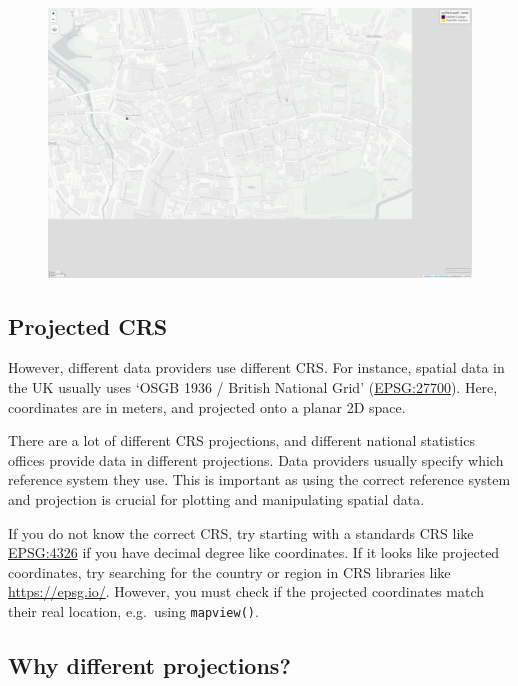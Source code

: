 \documentclass[
  letterpaper,
  DIV=11,
  numbers=noendperiod]{scrreprt}
\begin{document}
\begin{figure}[H]

{\centering \includegraphics{01_refresher_short_files/figure-pdf/unnamed-chunk-4-1.pdf}

}

\end{figure}

\hypertarget{projected-crs}{%
\subsection{Projected CRS}\label{projected-crs}}

However, different data providers use different CRS. For instance,
spatial data in the UK usually uses `OSGB 1936 / British National Grid'
(\href{https://epsg.io/27700}{EPSG:27700}). Here, coordinates are in
meters, and projected onto a planar 2D space.

There are a lot of different CRS projections, and different national
statistics offices provide data in different projections. Data providers
usually specify which reference system they use. This is important as
using the correct reference system and projection is crucial for
plotting and manipulating spatial data.

If you do not know the correct CRS, try starting with a standards CRS
like \href{https://epsg.io/4326}{EPSG:4326} if you have decimal degree
like coordinates. If it looks like projected coordinates, try searching
for the country or region in CRS libraries like \url{https://epsg.io/}.
However, you must check if the projected coordinates match their real
location, e.g.~using \texttt{mapview()}.

\hypertarget{why-different-projections}{%
\subsection{Why different
projections?}\label{why-different-projections}}
\end{document}
